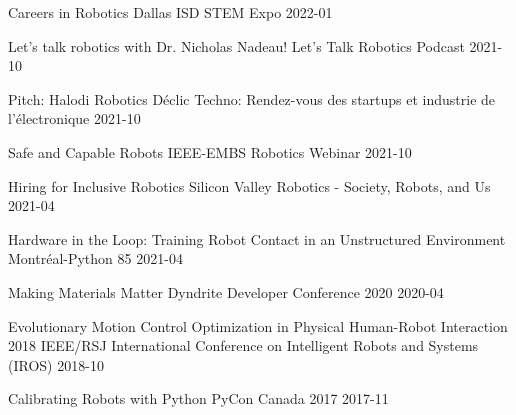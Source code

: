\begin{cvhonors}

    \cvhonor
    {Careers in Robotics}
    {Dallas ISD STEM Expo}
    {}
    {2022-01}

    \cvhonor
    {Let's talk robotics with Dr. Nicholas Nadeau!}
    {Let’s Talk Robotics Podcast}
    {}
    {2021-10}

    \cvhonor
    {Pitch: Halodi Robotics}
    {Déclic Techno: Rendez-vous des startups et industrie de l'électronique}
    {}
    {2021-10}

    \cvhonor
    {Safe and Capable Robots}
    {IEEE-EMBS Robotics Webinar}
    {}
    {2021-10}

    \cvhonor
    {Hiring for Inclusive Robotics}
    {Silicon Valley Robotics - Society, Robots, and Us}
    {}
    {2021-04}

    \cvhonor
    {Hardware in the Loop: Training Robot Contact in an Unstructured Environment}
    {Montréal-Python 85}
    {}
    {2021-04}

    \cvhonor
    {Making Materials Matter}
    {Dyndrite Developer Conference 2020}
    {}
    {2020-04}

    \cvhonor
    {Evolutionary Motion Control Optimization in Physical Human-Robot Interaction}
    {2018 IEEE/RSJ International Conference on Intelligent Robots and Systems (IROS)}
    {}
    {2018-10}

    \cvhonor
    {Calibrating Robots with Python}
    {PyCon Canada 2017}
    {}
    {2017-11}

\end{cvhonors}
